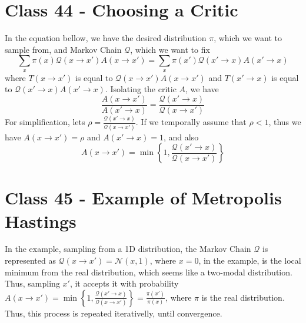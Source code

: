 \documentclass{article}
\begin{document}
\section{Class 44 - Choosing a Critic}
In the equation bellow, we have the desired distribution $\pi$, which we want to sample from, and Markov Chain $\mathcal{Q}$, which we want to fix
\begin{equation}
    \sum_x \pi(x)\mathcal{Q}(x \rightarrow x')A(x \rightarrow x') = \sum_x \pi(x')\mathcal{Q}(x' \rightarrow x)A(x' \rightarrow x) 
\end{equation}
where $T(x\rightarrow x')$ is equal to $\mathcal{Q}(x \rightarrow x')A(x \rightarrow x') $ and $T(x'\rightarrow x)$ is equal to $\mathcal{Q}(x' \rightarrow x)A(x' \rightarrow x)$. Isolating the critic $A$, we have
\begin{equation}
    \frac{A(x \rightarrow x')}{A(x' \rightarrow x)} = \frac{\mathcal{Q}(x' \rightarrow x)}{\mathcal{Q}(x \rightarrow x')}
\end{equation}
For simplification, lets $\rho = \frac{\mathcal{Q}(x' \rightarrow x)}{\mathcal{Q}(x \rightarrow x')}$. If we temporally assume that $\rho < 1$, thus we have $A(x \rightarrow x') = \rho$ and $A(x' \rightarrow x) = 1$, and also
\begin{equation}
    A(x \rightarrow x') = \min \left\{1, \frac{\mathcal{Q}(x' \rightarrow x)}{\mathcal{Q}(x \rightarrow x')} \right\}
\end{equation}


\section{Class 45 - Example of Metropolis Hastings}
In the example, sampling from a 1D distribution, the Markov Chain $\mathcal{Q}$ is represented as $\mathcal{Q}(x \rightarrow x') = \mathcal{N}(x, 1)$, where $x = 0$, in the example, is the local minimum from the real distribution, which seems like a two-modal distribution. Thus, sampling $x'$, it accepts it with probability $A(x \rightarrow x') = \min \left\{1, \frac{\mathcal{Q}(x' \rightarrow x)}{\mathcal{Q}(x \rightarrow x')} \right\} = \frac{\pi(x')}{\pi(x)}$, where $\pi$ is the real distribution. Thus, this process is repeated iterativelly, until convergence.
\end{document}
